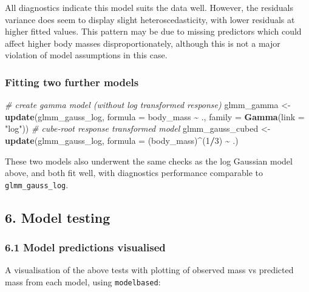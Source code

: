 \documentclass[
]{article}
\newenvironment{Shaded}{\begin{snugshade}}{\end{snugshade}}
\newcommand{\AttributeTok}[1]{\textcolor[rgb]{0.13,0.29,0.53}{#1}}
\newcommand{\CommentTok}[1]{\textcolor[rgb]{0.56,0.35,0.01}{\textit{#1}}}
\newcommand{\DecValTok}[1]{\textcolor[rgb]{0.00,0.00,0.81}{#1}}
\newcommand{\FunctionTok}[1]{\textcolor[rgb]{0.13,0.29,0.53}{\textbf{#1}}}
\newcommand{\NormalTok}[1]{#1}
\newcommand{\OtherTok}[1]{\textcolor[rgb]{0.56,0.35,0.01}{#1}}
\newcommand{\SpecialCharTok}[1]{\textcolor[rgb]{0.81,0.36,0.00}{\textbf{#1}}}
\newcommand{\StringTok}[1]{\textcolor[rgb]{0.31,0.60,0.02}{#1}}
\begin{document}
All diagnostics indicate this model suits the data well. However, the
residuals variance does seem to display slight heteroscedasticity, with
lower residuals at higher fitted values. This pattern may be due to
missing predictors which could affect higher body masses
disproportionately, although this is not a major violation of model
assumptions in this case.

\subsubsection{Fitting two further
models}\label{fitting-two-further-models}

\begin{Shaded}
\begin{Highlighting}[]
\CommentTok{\# create gamma model (without log transformed response)}
\NormalTok{glmm\_gamma }\OtherTok{\textless{}{-}} \FunctionTok{update}\NormalTok{(glmm\_gauss\_log, }\AttributeTok{formula =}\NormalTok{ body\_mass }\SpecialCharTok{\textasciitilde{}}\NormalTok{ ., }\AttributeTok{family =} \FunctionTok{Gamma}\NormalTok{(}\AttributeTok{link =} \StringTok{"log"}\NormalTok{))}
\CommentTok{\# cube{-}root response transformed model}
\NormalTok{glmm\_gauss\_cubed }\OtherTok{\textless{}{-}} \FunctionTok{update}\NormalTok{(glmm\_gauss\_log, }\AttributeTok{formula =}\NormalTok{ (body\_mass)}\SpecialCharTok{\^{}}\NormalTok{(}\DecValTok{1}\SpecialCharTok{/}\DecValTok{3}\NormalTok{) }\SpecialCharTok{\textasciitilde{}}\NormalTok{ .)}
\end{Highlighting}
\end{Shaded}

These two models also underwent the same checks as the log Gaussian
model above, and both fit well, with diagnostics performance comparable
to \texttt{glmm\_gauss\_log}.

\subsection{6. Model testing}\label{model-testing}

\subsubsection{6.1 Model predictions
visualised}\label{model-predictions-visualised}

A visualisation of the above tests with plotting of observed mass vs
predicted mass from each model, using \texttt{modelbased}:
\end{document}
